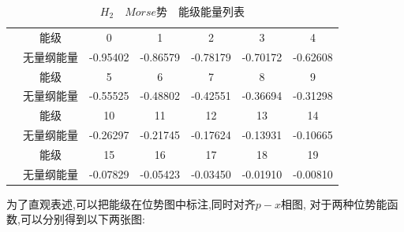 \documentclass[11pt, a4paper, oneside]{ctexart}
\begin{document}
{{{{    {
    \begin{table}[htbp]
        \caption{$H_2\quad Morse$势\ \ 能级能量列表} 
        \centering
    \begin{tabular}{@{}ccccccc@{}}
    \toprule
    \centering
    
    \multirow{7}{*}& 能级    & 0 & 1        & 2        & 3        & 4                \\ \cmidrule(){1-7} 
                             & 无量纲能量 & -0.95402 & -0.86579 & -0.78179 & -0.70172 & -0.62608 \\\cmidrule[1pt](){1-7} 
                             & 能级    & 5 & 6        & 7        & 8        & 9             \\\cmidrule(){1-7} 
                             & 无量纲能量 & -0.55525 & -0.48802 & -0.42551 & -0.36694 & -0.31298 \\\cmidrule[1pt](){1-7} 
                             & 能级    & 10 & 11       & 12       & 13       & 14              \\\cmidrule(){1-7} 
                             & 无量纲能量 & -0.26297 & -0.21745 & -0.17624 & -0.13931 & -0.10665 \\\cmidrule[1pt](){1-7} 
                             & 能级    &15 & 16       & 17       & 18       & 19              \\\cmidrule(){1-7} 
                             & 无量纲能量 & -0.07829 & -0.05423 & -0.03450 & -0.01910 & -0.00810 \\ \cmidrule[1pt](){1-7} 
    \end{tabular}
    \end{table}
    }


    为了直观表述,可以把能级在位势图中标注,同时对齐$p-x$相图,
    对于两种位势能函数,可以分别得到以下两张图:
    {
        \begin{figure}[!ht]
	

\end{figure}}}}}}
\end{document}
